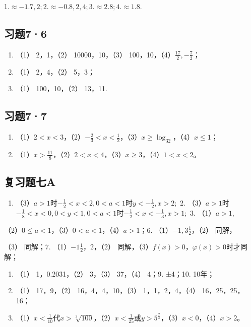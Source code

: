 1.\(\approx -1.7, 2; 2. \approx -0.8, 2, 4; 3. \approx 2.8; 4. \approx 1.8.\)

\subsection{习题7·6}

\begin{enumerate}
\item
  （1） 2，1，（2） 10000，10，（3）
  100，10，（4）\(\frac{17}{2}, -\frac{7}{2}\)；
\item
  （1） 2，4，（2） 5，3；
\item
  （1） 100，10，（2） 13，11.
\end{enumerate}

\subsection{习题7·7}

\begin{enumerate}
\item
  （1）\(2 < x < 3\)，（2）\(-\frac{2}{3} < x < \frac{1}{2}\)，（3）\(x \geqslant \log_32\)，（4）\(x \leqslant 1\)；
\item
  （1）\(x > \frac{11}{8}\)，（2）\(2 < x < 4\)，（3）\(x \geqslant 3\)，（4）\(1 < x < 2\)。
\end{enumerate}

\subsection{复习题七A}

\begin{enumerate}
\item
  （3）\(a > 1\)时\(-\frac{1}{2} < x < 2, 0 < a < 1\)时\(y < -\frac{1}{2}, x > 2;\)
  2.
  （3）\(a > 1\)时\(-\frac{1}{8} < x < 0, 0 < y < 1, 0 < a < 1\)时\(-\frac{1}{2} < x < -\frac{1}{3}, x > 1;\)
  3. （1）\(a > 1,\)
\end{enumerate}

（2）\(0 \leqslant a < 1\)，（3）\(0 < a < 1\)，（4）\(a > 1\)；6.
（1）\(-1, 3\frac{1}{2}\)，（2） 同解，

（3） 同解；7. （1）\(-1\frac{1}{2}\)，2，（2）
同解，（3）\(f(x) > 0\)，\(\varphi(x) > 0\)时才同解；

\begin{enumerate}[start=8]
\item
  （1） 1，0.2031，（2） 3，（3） 37，（4） 4；9. ±4；10. 10年；
\item
  （1） 17，9，（2） 16，4，4，10，（3） 1，1，2，4，（4）
  16，25，25，16；
\item
  （1）\(x < \frac{1}{10}\)代\(x > \sqrt[3]{100}\)，（2）\(x < \frac{1}{25}\)或\(y > 5^{\frac{2}{3}}\)，（3）\(x < 0\)，（4）\(x > 2\)。
\end{enumerate}

